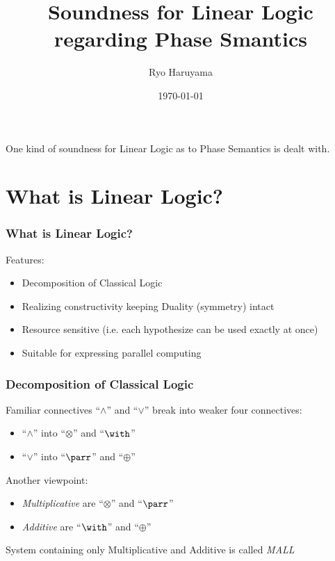 \documentclass[dvipdfmx,cjk]{beamer}
\theoremstyle{example}
\begin{document}
\title[LL]{Soundness for Linear Logic regarding Phase Smantics} 
\author[Haruyama]{Ryo Haruyama}
\date{\today}

\begin{frame}
  \titlepage
\end{frame}

\begin{frame}
  One kind of soundness for Linear Logic as to Phase Semantics is dealt with.
  \tableofcontents
\end{frame}

\section{What is Linear Logic?}
                          
\begin{frame}
  \frametitle{What is Linear Logic?}
  Features:

  \begin{itemize}
    \item Decomposition of Classical Logic 
    \item Realizing constructivity keeping Duality (symmetry) intact 
    \item Resource sensitive (i.e. each hypothesize can be used exactly at once) 
    \item Suitable for expressing parallel computing
  \end{itemize}
  
\end{frame}

\begin{frame}
  \frametitle{Decomposition of Classical Logic} 

    Familiar connectives ``$\wedge$'' and ``$\vee$'' break into weaker four connectives:

    \begin{itemize}
      \item ``$\wedge$'' into ``$\otimes$'' and ``$\with$'' 
      \item ``$\vee$''   into ``$\parr$''   and ``$\oplus$'' 
    \end{itemize}

    Another viewpoint:

    \begin{itemize}
      \item \textit{Multiplicative} are ``$\otimes$'' and ``$\parr$'' 
      \item \textit{Additive} are ``$\with$''   and ``$\oplus$'' 
    \end{itemize}

    System containing only Multiplicative and Additive is called \textit{MALL}
    
\end{frame}
\end{document}
